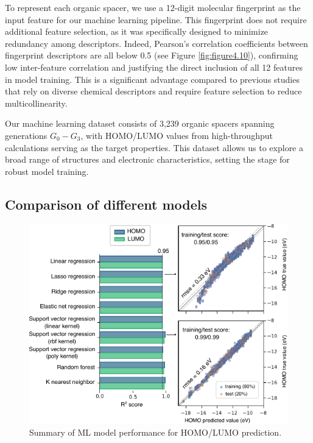 To represent each organic spacer, we use a 12-digit molecular fingerprint as the input feature for our machine learning pipeline. This fingerprint does not require additional feature selection, as it was specifically designed to minimize redundancy among descriptors. Indeed, Pearson’s correlation coefficients between fingerprint descriptors are all below 0.5 (see Figure \ref{fig:figure4.10}), confirming low inter-feature correlation and justifying the direct inclusion of all 12 features in model training. This is a significant advantage compared to previous studies that rely on diverse chemical descriptors and require feature selection to reduce multicollinearity\cite{RN315,RN283}.

Our machine learning dataset consists of 3,239 organic spacers spanning generations $G_0-G_3$, with HOMO/LUMO values from high-throughput calculations serving as the target properties. This dataset allows us to explore a broad range of structures and electronic characteristics, setting the stage for robust model training.

\subsection{Comparison of different models}

\begin{figure}[htbp]
    \centering
    \includegraphics[width=\textwidth]{figures/HT-ML/figure4-11.pdf}
    \caption{Summary of ML model performance for HOMO/LUMO prediction.}
    \label{fig:figure4.11}
\end{figure}

